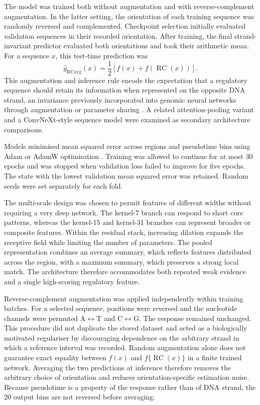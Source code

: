 \documentclass[a4paper,12pt]{article}
\begin{document}
The model was trained both without augmentation and with reverse-complement augmentation. In the latter setting, the orientation of each training sequence was randomly reversed and complemented. Checkpoint selection initially evaluated validation sequences in their recorded orientation. After training, the final strand-invariant predictor evaluated both orientations and took their arithmetic mean. For a sequence $x$, this test-time prediction was
\[
\widehat{y}_{\mathrm{RCavg}}(x)=\frac{1}{2}\left[f(x)+f\!\left(\operatorname{RC}(x)\right)\right].
\]
This augmentation and inference rule encode the expectation that a regulatory sequence should retain its information when represented on the opposite DNA strand, an invariance previously incorporated into genomic neural networks through augmentation or parameter sharing \citep{shrikumar2017rc}. A related attention-pooling variant and a ConvNeXt-style sequence model were examined as secondary architecture comparisons.

Models minimised mean squared error across regions and pseudotime bins using Adam or AdamW optimisation \citep{kingma2015adam,loshchilov2019adamw}. Training was allowed to continue for at most 30 epochs and was stopped when validation loss failed to improve for five epochs. The state with the lowest validation mean squared error was retained. Random seeds were set separately for each fold.

The multi-scale design was chosen to permit features of different widths without requiring a very deep network. The kernel-7 branch can respond to short core patterns, whereas the kernel-15 and kernel-31 branches can represent broader or composite features. Within the residual stack, increasing dilation expands the receptive field while limiting the number of parameters. The pooled representation combines an average summary, which reflects features distributed across the region, with a maximum summary, which preserves a strong local match. The architecture therefore accommodates both repeated weak evidence and a single high-scoring regulatory feature.

Reverse-complement augmentation was applied independently within training batches. For a selected sequence, positions were reversed and the nucleotide channels were permuted A$\leftrightarrow$T and C$\leftrightarrow$G. The response remained unchanged. This procedure did not duplicate the stored dataset and acted as a biologically motivated regulariser by discouraging dependence on the arbitrary strand in which a reference interval was recorded. Random augmentation alone does not guarantee exact equality between $f(x)$ and $f\{\operatorname{RC}(x)\}$ in a finite trained network. Averaging the two predictions at inference therefore removes the arbitrary choice of orientation and reduces orientation-specific estimation noise. Because pseudotime is a property of the response rather than of DNA strand, the 20 output bins are not reversed before averaging.
\end{document}
